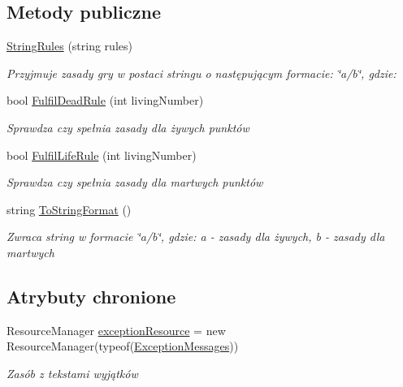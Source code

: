 \subsection*{Metody publiczne}
\begin{DoxyCompactItemize}
\item 
\hyperlink{class_convay_1_1_core_1_1_string_rules_a7415d212989c204cf5135746b62c0bda}{String\+Rules} (string rules)
\begin{DoxyCompactList}\small\item\em Przyjmuje zasady gry w postaci stringu o następującym formacie\+: \char`\"{}a/b\char`\"{}, gdzie\+: \end{DoxyCompactList}\item 
bool \hyperlink{class_convay_1_1_core_1_1_string_rules_ae5cbc291877c0ef6b27302d64e7666ed}{Fulfil\+Dead\+Rule} (int living\+Number)
\begin{DoxyCompactList}\small\item\em Sprawdza czy spełnia zasady dla żywych punktów \end{DoxyCompactList}\item 
bool \hyperlink{class_convay_1_1_core_1_1_string_rules_abe8f44d51271581b0923aacf768b71ba}{Fulfil\+Life\+Rule} (int living\+Number)
\begin{DoxyCompactList}\small\item\em Sprawdza czy spełnia zasady dla martwych punktów \end{DoxyCompactList}\item 
string \hyperlink{class_convay_1_1_core_1_1_string_rules_a4ecd053bf61402f58c6d40bf1e368a8a}{To\+String\+Format} ()
\begin{DoxyCompactList}\small\item\em Zwraca string w formacie \char`\"{}a/b\char`\"{}, gdzie\+: a -\/ zasady dla żywych, b -\/ zasady dla martwych \end{DoxyCompactList}\end{DoxyCompactItemize}
\subsection*{Atrybuty chronione}
\begin{DoxyCompactItemize}
\item 
Resource\+Manager \hyperlink{class_convay_1_1_core_1_1_string_rules_a0003339d29aea6bd1d4bfbcc6facc9d5}{exception\+Resource} = new Resource\+Manager(typeof(\hyperlink{class_convay_1_1_core_1_1_exception_messages}{Exception\+Messages}))
\begin{DoxyCompactList}\small\item\em Zasób z tekstami wyjątków \end{DoxyCompactList}\end{DoxyCompactItemize}


